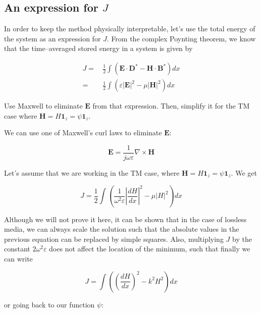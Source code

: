 \subsection{An expression for $J$}

In order to keep the method physically interpretable, let's use the total energy of the system as an expression for $J$. From the complex Poynting theorem, we know that the time--averaged stored energy in a system is given by

\begin{align}
J =& \, \frac{1}{2} \int ( {\mathbf E} \cdot {\mathbf D}^* - {\mathbf H} \cdot {\mathbf B}^* ) dx \\
  =& \, \frac{1}{2} \int ( \varepsilon |{\mathbf E}|^2 - \mu |{\mathbf H}|^2 ) dx
\end{align} 

\begin{cue}
Use Maxwell to eliminate ${\mathbf E}$ from that expression. Then, simplify it for the TM case where ${\mathbf H} = H {\mathbf 1}_z = \psi {\mathbf 1}_z $.  
\end{cue}

We can use one of Maxwell's curl laws to eliminate ${\mathbf E}$:

\begin{equation}
{\mathbf E} = \frac{1}{j \omega \varepsilon} \nabla \times {\mathbf H}
\end{equation}  

Let's assume that we are working in the TM case, where ${\mathbf H} = H {\mathbf 1}_z = \psi {\mathbf 1}_z $. We get

\begin{equation}
J = \frac{1}{2} \int \left( \frac{1}{\omega ^2 \varepsilon}\left|{\frac{d H}{d x}}\right|^2 - \mu |H|^2 \right) dx
\end{equation}

Although we will not prove it here, it can be shown that in the case of lossless media, we can always scale the solution such that the absolute values in the previous equation can be replaced by simple squares. Also, multiplying $J$ by the constant $2 \omega ^2 \varepsilon$ does not affect the location of the minimum, such that finally we can write

\begin{equation}
J = \int \left( \left(\frac{d H}{d x}\right)^2 - k^2 H^2 \right) dx
\end{equation}

or going back to our function $\psi$:

